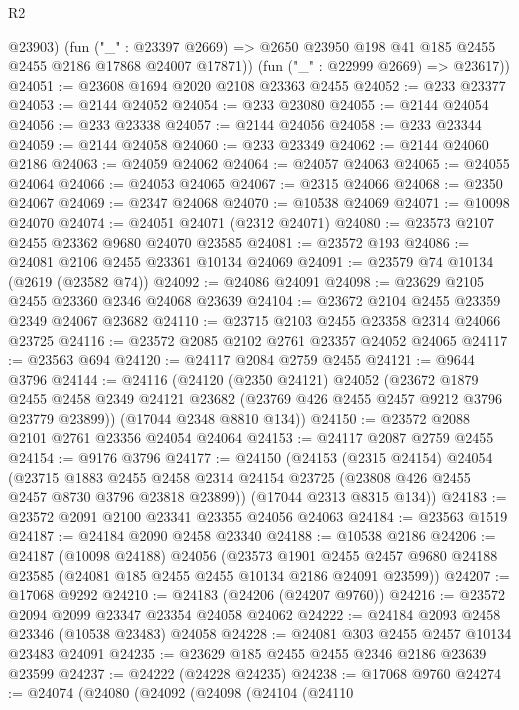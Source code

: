 \begin{lexlean}{R2}
\begin{coremodule}
          @23903)
        (fun ("_" : @23397 @2669) =>
        @2650 @23950 @198 @41 @185 @2455 @2455 @2186 @17868 @24007 @17871))
      (fun ("_" : @22999 @2669) => @23617))
@24051 := @23608 @1694 @2020 @2108 @23363 @2455
@24052 := @233 @23377
@24053 := @2144 @24052
@24054 := @233 @23080
@24055 := @2144 @24054
@24056 := @233 @23338
@24057 := @2144 @24056
@24058 := @233 @23344
@24059 := @2144 @24058
@24060 := @233 @23349
@24062 := @2144 @24060 @2186
@24063 := @24059 @24062
@24064 := @24057 @24063
@24065 := @24055 @24064
@24066 := @24053 @24065
@24067 := @2315 @24066
@24068 := @2350 @24067
@24069 := @2347 @24068
@24070 := @10538 @24069
@24071 := @10098 @24070
@24074 := @24051 @24071 (@2312 @24071)
@24080 := @23573 @2107 @2455 @23362 @9680 @24070 @23585
@24081 := @23572 @193
@24086 := @24081 @2106 @2455 @23361 @10134 @24069
@24091 := @23579 @74 @10134 (@2619 (@23582 @74))
@24092 := @24086 @24091
@24098 := @23629 @2105 @2455 @23360 @2346 @24068 @23639
@24104 := @23672 @2104 @2455 @23359 @2349 @24067 @23682
@24110 := @23715 @2103 @2455 @23358 @2314 @24066 @23725
@24116 := @23572 @2085 @2102 @2761 @23357 @24052 @24065
@24117 := @23563 @694
@24120 := @24117 @2084 @2759 @2455
@24121 := @9644 @3796
@24144 := @24116
    (@24120
      (@2350 @24121)
      @24052
      (@23672
        @1879
        @2455
        @2458
        @2349
        @24121
        @23682
        (@23769 @426 @2455 @2457 @9212 @3796 @23779 @23899))
      (@17044 @2348 @8810 @134))
@24150 := @23572 @2088 @2101 @2761 @23356 @24054 @24064
@24153 := @24117 @2087 @2759 @2455
@24154 := @9176 @3796
@24177 := @24150
    (@24153
      (@2315 @24154)
      @24054
      (@23715
        @1883
        @2455
        @2458
        @2314
        @24154
        @23725
        (@23808 @426 @2455 @2457 @8730 @3796 @23818 @23899))
      (@17044 @2313 @8315 @134))
@24183 := @23572 @2091 @2100 @23341 @23355 @24056 @24063
@24184 := @23563 @1519
@24187 := @24184 @2090 @2458 @23340
@24188 := @10538 @2186
@24206 := @24187
    (@10098 @24188)
    @24056
    (@23573
      @1901
      @2455
      @2457
      @9680
      @24188
      @23585
      (@24081 @185 @2455 @2455 @10134 @2186 @24091 @23599))
@24207 := @17068 @9292
@24210 := @24183 (@24206 (@24207 @9760))
@24216 := @23572 @2094 @2099 @23347 @23354 @24058 @24062
@24222 := @24184 @2093 @2458 @23346 (@10538 @23483) @24058
@24228 := @24081 @303 @2455 @2457 @10134 @23483 @24091
@24235 := @23629 @185 @2455 @2455 @2346 @2186 @23639 @23599
@24237 := @24222 (@24228 @24235)
@24238 := @17068 @9760
@24274 := @24074
    (@24080
      (@24092
        (@24098
          (@24104
            (@24110

\end{coremodule}
\end{lexlean}
